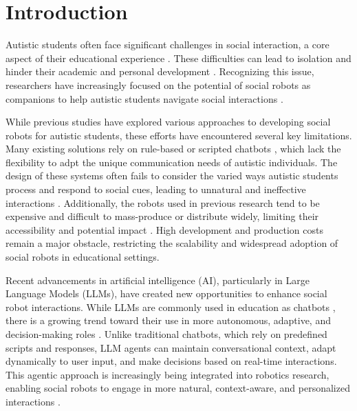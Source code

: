 \section{Introduction}

Autistic students often face significant challenges in social interaction, a core aspect of their educational experience \cite{rubin2004challenges}\cite{van2015higher}. These difficulties can lead to isolation and hinder their academic and personal development \cite{whitby2009academic}. Recognizing this issue, researchers have increasingly focused on the potential of social robots as companions to help autistic students navigate social interactions \cite{lorenzo2021action}\cite{kouroupa2022use}\cite{perez2024analysis}\cite{so2018using}.

While previous studies have explored various approaches to developing social robots for autistic students, these efforts have encountered several key limitations. Many existing solutions rely on rule-based or scripted chatbots \cite{bradford2020hear}\cite{halabieh2024computer}, which lack the flexibility to adpt the unique communication needs of autistic individuals. The design of these systems often fails to consider the varied ways autistic students process and respond to social cues, leading to unnatural and ineffective interactions \cite{xygkou2024can}\cite{gu2024technological}. Additionally, the robots used in previous research tend to be expensive and difficult to mass-produce or distribute widely, limiting their accessibility and potential impact \cite{alcorn2019educators}\cite{tennyson2016accessible}. High development and production costs remain a major obstacle, restricting the scalability and widespread adoption of social robots in educational settings.

Recent advancements in artificial intelligence (AI), particularly in Large Language Models (LLMs), have created new opportunities to enhance social robot interactions. While LLMs are commonly used in education as chatbots \cite{adeshola2024opportunities}\cite{lo2023impact}, there is a growing trend toward their use in more autonomous, adaptive, and decision-making roles \cite{lee23generative}. Unlike traditional chatbots, which rely on predefined scripts and responses, LLM agents can maintain conversational context, adapt dynamically to user input, and make decisions based on real-time interactions. This agentic approach is increasingly being integrated into robotics research, enabling social robots to engage in more natural, context-aware, and personalized interactions \cite{wang2024large}\cite{kim2024survey}\cite{driess2023palm}.

